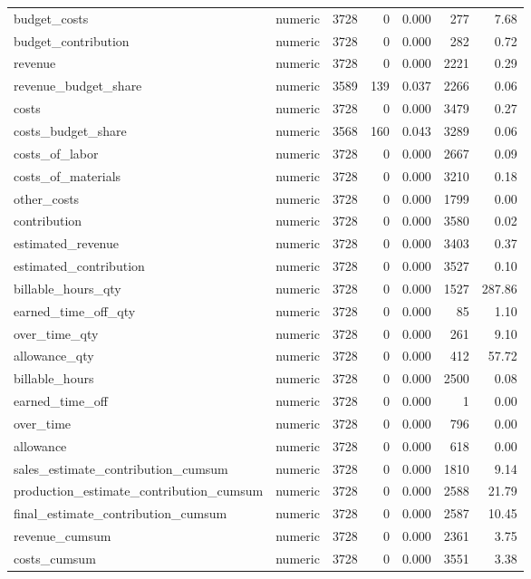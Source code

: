 \begin{landscape}
\begin{longtable}[t]{llrrrrr}
budget\_costs & numeric & 3728 & 0 & 0.000 & 277 & 7.68\\
budget\_contribution & numeric & 3728 & 0 & 0.000 & 282 & 0.72\\
revenue & numeric & 3728 & 0 & 0.000 & 2221 & 0.29\\
revenue\_budget\_share & numeric & 3589 & 139 & 0.037 & 2266 & 0.06\\
costs & numeric & 3728 & 0 & 0.000 & 3479 & 0.27\\
costs\_budget\_share & numeric & 3568 & 160 & 0.043 & 3289 & 0.06\\
costs\_of\_labor & numeric & 3728 & 0 & 0.000 & 2667 & 0.09\\
costs\_of\_materials & numeric & 3728 & 0 & 0.000 & 3210 & 0.18\\
other\_costs & numeric & 3728 & 0 & 0.000 & 1799 & 0.00\\
contribution & numeric & 3728 & 0 & 0.000 & 3580 & 0.02\\
estimated\_revenue & numeric & 3728 & 0 & 0.000 & 3403 & 0.37\\
estimated\_contribution & numeric & 3728 & 0 & 0.000 & 3527 & 0.10\\
billable\_hours\_qty & numeric & 3728 & 0 & 0.000 & 1527 & 287.86\\
earned\_time\_off\_qty & numeric & 3728 & 0 & 0.000 & 85 & 1.10\\
over\_time\_qty & numeric & 3728 & 0 & 0.000 & 261 & 9.10\\
allowance\_qty & numeric & 3728 & 0 & 0.000 & 412 & 57.72\\
billable\_hours & numeric & 3728 & 0 & 0.000 & 2500 & 0.08\\
earned\_time\_off & numeric & 3728 & 0 & 0.000 & 1 & 0.00\\
over\_time & numeric & 3728 & 0 & 0.000 & 796 & 0.00\\
allowance & numeric & 3728 & 0 & 0.000 & 618 & 0.00\\
sales\_estimate\_contribution\_cumsum & numeric & 3728 & 0 & 0.000 & 1810 & 9.14\\
production\_estimate\_contribution\_cumsum & numeric & 3728 & 0 & 0.000 & 2588 & 21.79\\
final\_estimate\_contribution\_cumsum & numeric & 3728 & 0 & 0.000 & 2587 & 10.45\\
revenue\_cumsum & numeric & 3728 & 0 & 0.000 & 2361 & 3.75\\
costs\_cumsum & numeric & 3728 & 0 & 0.000 & 3551 & 3.38\\

\end{longtable}
\end{landscape}
